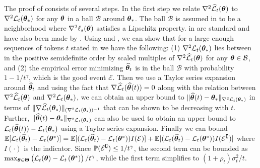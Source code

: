 \begin{remark}
\label{app:remark}
The proof of  consists of several steps. In the first step we relate $\nabla^2 \widehat{\cal L}_t(\bm{\theta})$ to $\nabla^2{\cal L}_t(\bm{\theta}_*)$ for any $\bm{\theta}$ in a ball $\mathcal{B}$ around $\bm{\theta}_*$. The ball $\mathcal{B}$ is assumed in  to be a neighborhood where $\nabla^2 \ell_s(\bm{\theta})$ satisfies a Lipschitz property.  in  are standard and have also been made by \citet{frostig2015competing, chaudhuri2015convergence, mukherjee2020generalized}. 
Using  and , we can show that for a large enough sequences of tokens $t$ stated in  we have the following: (1) $\nabla^2 {\cal L}_t(\bm{\theta}_*)$ lies between in the positive semidefinite order by scaled multiples of $\nabla^2 \widehat{\cal L}_t(\bm{\theta})$ for any $\bm{\theta} \in \mathcal{B}$, and (2) the empirical error minimizing ${\widehat{\bm{\theta}}}_t$ is in the ball $\mathcal{B}$ with probability $1 - 1/t^\gamma$, which is the good event $\mathcal{E}$. Then we use a Taylor series expansion around ${\widehat{\bm{\theta}}}_t$ and using the fact that $\nabla \widehat{\cal L}_t(\widehat{\bm{\theta}}(t)) = 0$ along with the relation between $\nabla^2 \widehat{\cal L}_t(\bm{\theta})$ and $\nabla^2 {\cal L}_t(\bm{\theta}_*)$, we can obtain an upper bound to $\lVert \widehat{\bm{\theta}}(t) - \bm{\theta}_*\rVert_{\nabla^2 {\cal L}_t(\bm{\theta}_*)}$ in terms of $\lVert \nabla \widehat{\cal L}_t(\bm{\theta}_*) \rVert_{(\nabla^2 {\cal L}_t(\bm{\theta}_*))^{-1}}$ that can be shown to be decreasing with $t$. 
Further, $\lVert \widehat{\bm{\theta}}(t) - \bm{\theta}_*\rVert_{\nabla^2 {\cal L}_t(\bm{\theta}_*)}$ can also be used to obtain an upper bound to ${\cal L}_t(\widehat{\bm{\theta}}(t)) - {\cal L}_t(\bm{\theta}_*)$ using a Taylor series expansion. 
%
Finally we can bound $\mathbb{E}[{\cal L}_{t}(\widehat{\bm{\theta}}_{t})-{\cal L}_{t}(\bm{\theta}^{*})] =\mathbb{E}[({\cal L}_{t}(\widehat{\bm{\theta}}_{t})-{\cal L}_{t}(\bm{\theta}^{*})) I(\mathcal{E})]+\mathbb{E}[({\cal L}_{t}(\widehat{\bm{\theta}}_{t})-{\cal L}_{t}(\bm{\theta}^{*})) I(\mathcal{E}^\complement)]$ where $I(\cdot)$ is the indicator. Since $\mathbb{P}(\mathcal{E}^\complement) \leq 1/t^\gamma$, the second term can be bounded as $\max_{\bm{\theta} \in \bm{\Theta}}\left({\cal L}_{t}(\bm{\theta})-{\cal L}_{t}\left(\bm{\theta}^{*}\right)\right)/t^{\gamma}$, while the first term simplifies to $(1 + \rho_t)\sigma_t^2/t$. 
\end{remark}

